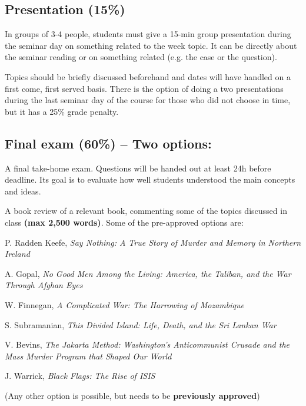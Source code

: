\documentclass[12pt, a4paper]{article}
\begin{document}
\subsection*{Presentation (15\%)}

In groups of 3-4 people, students must give a 15-min group presentation during the seminar day on something related to the week topic. It can be directly about the seminar reading or on something related (e.g. the case or the question).

Topics should be briefly discussed beforehand and dates will have handled on a first come, first served basis. There is the option of doing a two presentations during the last seminar day of the course for those who did not choose in time, but it has a 25\% grade penalty.

\subsection*{Final exam (60\%) -- Two options:}

\begin{itemize}
  \item[\textbf{A.}] A final take-home exam. Questions will be handed out at least 24h before deadline. Its goal is to evaluate how well students understood the main concepts and ideas.
  \item[\textbf{B.}] A book review of a relevant book, commenting some of the topics discussed in class \textbf{(max 2,500 words)}. Some of the pre-approved options are:
  {\small
  \item[-] P. Radden Keefe, \textit{Say Nothing: A True Story of Murder and Memory in Northern Ireland} \vspace{-10pt}
  \item[-] A. Gopal, \textit{No Good Men Among the Living: America, the Taliban, and the War Through Afghan Eyes} \vspace{-10pt}
  \item[-] W. Finnegan, \textit{A Complicated War: The Harrowing of Mozambique} \vspace{-10pt}
  \item[-] S. Subramanian, \textit{This Divided Island: Life, Death, and the Sri Lankan War} \vspace{-10pt}
  \item[-] V. Bevins, \textit{The Jakarta Method: Washington's Anticommunist Crusade and the Mass Murder Program that Shaped Our World} \vspace{-10pt}
  \item[-] J. Warrick, \textit{Black Flags: The Rise of ISIS}
  }
  \item[] (Any other option is possible, but needs to be \textbf{previously approved})
\end{itemize}
\end{document}
